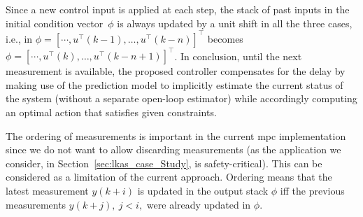 Since a new control input is applied at each step, the stack of past inputs in the initial condition vector~$\phi$ is always updated by a unit shift in all the three cases, i.e., in $\phi=[\cdots, u^{\top}(k-1),\ldots,u^{\top}(k-n)]^{\top}$ becomes $\phi = [\cdots, u^{\top}(k),\ldots,u^{\top}(k-n+1)]^{\top}$. In conclusion, until the next measurement is available, the proposed controller compensates for the delay by making use of the prediction model to implicitly estimate the current status of the system (without a  separate open-loop estimator) while accordingly computing an optimal action that satisfies given constraints. 

The ordering of measurements is important in the current \gls{mpc} implementation since we do not want to allow discarding measurements (as the application we consider, in Section~\ref{sec:lkas_case_Study}, is safety-critical). 
This can be considered as a limitation of the current approach. Ordering means that the latest measurement $y(k+i)$ is updated in the output stack $\phi$ iff the previous measurements $y(k+j),\ j<i,$ were already updated in $\phi$.
